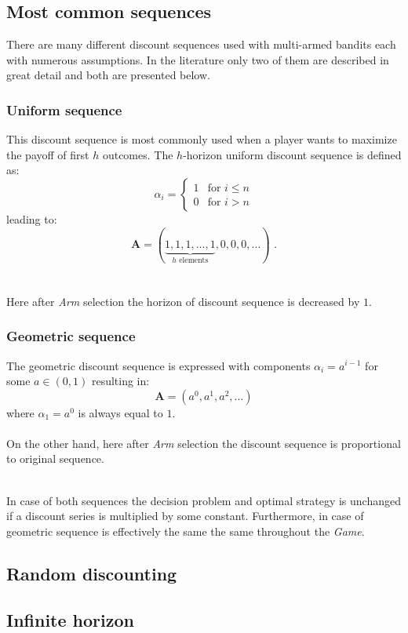\documentclass[12pt, a4paper, pdflatex]{report}
\begin{document}
\subsection{Most common sequences}
There are many different discount sequences used with multi-armed bandits each with numerous assumptions. In the literature only two of them are described in great detail and both are presented below.
{
\subsubsection{Uniform sequence}
This discount sequence is most commonly used when a player wants to maximize the payoff of first $h$ outcomes.
The $h$-horizon uniform discount sequence is defined as:
\[
 \alpha_i =
  \begin{cases}
   1 & \text{for } i \leq n \\
   0 & \text{for } i > n
  \end{cases}
\]
leading to:
\[
  \mathbf{A} = ( \underbrace{ 1, 1, 1, ..., 1}_{h\text{ elements}}, 0, 0, 0, ... ) \text{ .}
\]\\
\\
Here after \emph{Arm} selection the horizon of discount sequence is decreased by $1$.


\subsubsection{Geometric sequence}
The geometric discount sequence is expressed with components $\alpha_i = a^{i-1}$ for some $a \in ( 0, 1 )$ resulting in:
$$
\mathbf{A} = \left( a^0, a^1, a^2, ... \right)
$$
where $\alpha_1 = a^0$ is always equal to $1$.\\
\\
On the other hand, here after \emph{Arm} selection the discount sequence is proportional to original sequence.\\
\\

}
In case of both sequences the decision problem and optimal strategy is unchanged if a discount series is multiplied by some constant. Furthermore, in case of geometric sequence is effectively the same the same throughout the \emph{Game}.

\subsection{Random discounting}
\subsection{Infinite horizon }
\end{document}
